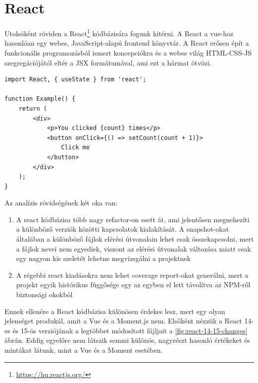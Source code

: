 \section{React}

Utolsóként röviden a React\footnote{\url{https://hu.reactjs.org/}} kódbázisára fogunk kitérni. A React a vue-hoz hasonlóan egy webes, JavaScript-alapú frontend könyvtár. A React erősen épít a funkcionális programozásból ismert koncepciókra és a webes világ HTML-CSS-JS szegregációjától eltér a JSX formátumával, ami ezt a hármat ötvözi.

\begin{lstlisting}
import React, { useState } from 'react';

function Example() {
    return (
        <div>
            <p>You clicked {count} times</p>
            <button onClick={() => setCount(count + 1)}>
                Click me
            </button>
        </div>
    );
}
\end{lstlisting}

Az analízis rövidségének két oka van:
\begin{enumerate}
    \item A react kódbázisa több nagy refactor-on esett át, ami jelentősen megnehezíti a különböző verziók közötti kapcsolatok kialakítását. A snapshot-okat általában a különböző fájlok elérési útvonalain lehet csak összekapcsolni, mert a fájlok nevei nem egyediek, viszont az elérési útvonalak változása miatt csak egy nagyon kis szeletét lehetne megvizsgálni a projektnek
    \item A régebbi react kiadásokra nem lehet coverage report-okat generálni, mert a projekt egyik histórikus függősége egy az egyben el lett távolítva az NPM-ről biztonsági okokból
\end{enumerate}

Ennek ellenére a React kódbázisa különösen érdekes lesz, mert egy olyan jelenséget produkál, amit a Vue és a Moment.js nem.
Elsőként nézzük a React 14-es és 15-ös verziójának a legtöbbet módosított fájljait a \ref{fig:react-14-15-changes} ábrán. Eddig egyelőre nem látszik semmi különös, nagyrészt hasonló értékeket és mintákat látunk, mint a Vue és a Moment esetében.

